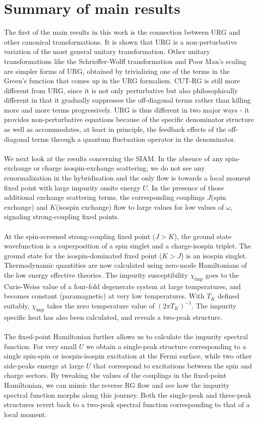 \documentclass[twoside]{report}
\numberwithin{equation}{section}
\begin{document}
\section{Summary of main results}
The first of the main results in this work is the connection between URG and other canonical transformations. It is shown that URG is a non-perturbative variation of the most general unitary transformation. Other unitary transformations like the Schrieffer-Wolff transformation and Poor Man's scaling are simpler forms of URG, obtained by trivializing one of the terms in the Green's function that comes up in the URG formalism. CUT-RG is still more different from URG, since it is not only perturbative but also philosophically different in that it gradually suppresses the off-diagonal terms rather than killing more and more terms progressively. URG is thus different in two major ways - it provides non-perturbative equations because of the specific denominator structure as well as accommodates, at least in principle, the feedback effects of the off-diagonal terms through a quantum fluctuation operator in the denominator.
\\\\We next look at the results concerning the SIAM. In the absence of any spin-exchange or charge isospin-exchange scattering, we do not see any renormalization in the hybridisation and the only flow is towards a local moment fixed point with large impurity onsite energy \(U\). In the presence of those additional exchange scattering terms, the corresponding couplings \(J\)(spin exchange) and \(K\)(isospin exchange) flow to large values for low values of \(\omega\), signaling strong-coupling fixed points.
\\\\At the spin-screened strong-coupling fixed point (\(J>K\)), the ground state wavefunction is a superposition of a spin singlet and a charge-isospin triplet. The ground state for the isospin-dominated fixed point (\(K>J\)) is an isospin singlet. Thermodynamic quantities are now calculated using zero-mode Hamiltonians of the low energy effective theories. The impurity susceptibility \(\chi_\text{imp}\) goes to the Curie-Weiss value of a four-fold degenerate system at large temperatures, and becomes constant (paramagnetic) at very low temperatures. With \(T_K\) defined suitably, \(\chi_\text{imp}\) takes the zero temperature value of \(\left( 2\pi T_K \right) ^{-1}\). The impurity specific heat has also been calculated, and reveals a two-peak structure.
\\\\The fixed-point Hamiltonian further allows us to calculate the impurity spectral function. For very small \(U\) we obtain a single-peak structure corresponding to a single spin-spin or isospin-isospin excitation at the Fermi surface, while two other side-peaks emerge at large \(U\) that correspond to excitations between the spin and charge sectors. By tweaking the values of the couplings in the fixed-point Hamiltonian, we can mimic the reverse RG flow and see how the impurity spectral function morphs along this journey. Both the single-peak and three-peak structures revert back to a two-peak spectral function corresponding to that of a local moment.
\end{document}
